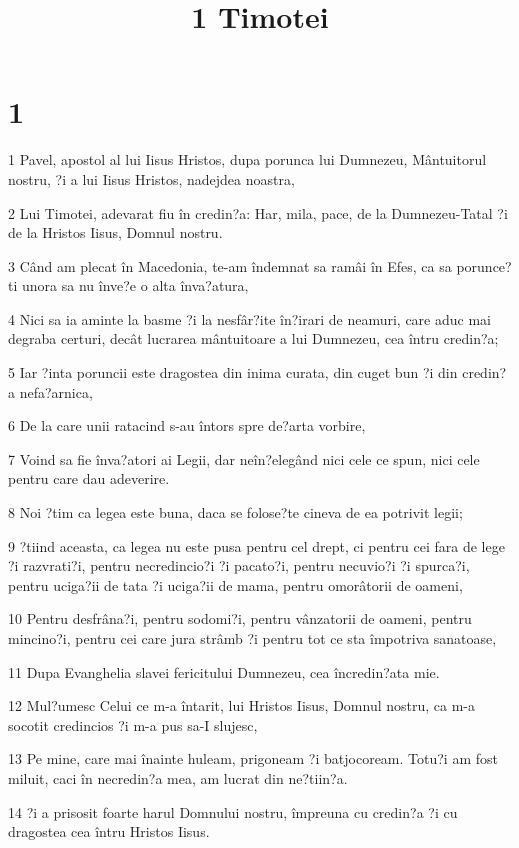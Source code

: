 

\title{1 Timotei}


\chapter{1}

\par 1 Pavel, apostol al lui Iisus Hristos, dupa porunca lui Dumnezeu, Mântuitorul nostru, ?i a lui Iisus Hristos, nadejdea noastra,
\par 2 Lui Timotei, adevarat fiu în credin?a: Har, mila, pace, de la Dumnezeu-Tatal ?i de la Hristos Iisus, Domnul nostru.
\par 3 Când am plecat în Macedonia, te-am îndemnat sa ramâi în Efes, ca sa porunce?ti unora sa nu înve?e o alta înva?atura,
\par 4 Nici sa ia aminte la basme ?i la nesfâr?ite în?irari de neamuri, care aduc mai degraba certuri, decât lucrarea mântuitoare a lui Dumnezeu, cea întru credin?a;
\par 5 Iar ?inta poruncii este dragostea din inima curata, din cuget bun ?i din credin?a nefa?arnica,
\par 6 De la care unii ratacind s-au întors spre de?arta vorbire,
\par 7 Voind sa fie înva?atori ai Legii, dar neîn?elegând nici cele ce spun, nici cele pentru care dau adeverire.
\par 8 Noi ?tim ca legea este buna, daca se folose?te cineva de ea potrivit legii;
\par 9 ?tiind aceasta, ca legea nu este pusa pentru cel drept, ci pentru cei fara de lege ?i razvrati?i, pentru necredincio?i ?i pacato?i, pentru necuvio?i ?i spurca?i, pentru uciga?ii de tata ?i uciga?ii de mama, pentru omorâtorii de oameni,
\par 10 Pentru desfrâna?i, pentru sodomi?i, pentru vânzatorii de oameni, pentru mincino?i, pentru cei care jura strâmb ?i pentru tot ce sta împotriva sanatoase,
\par 11 Dupa Evanghelia slavei fericitului Dumnezeu, cea încredin?ata mie.
\par 12 Mul?umesc Celui ce m-a întarit, lui Hristos Iisus, Domnul nostru, ca m-a socotit credincios ?i m-a pus sa-I slujesc,
\par 13 Pe mine, care mai înainte huleam, prigoneam ?i batjocoream. Totu?i am fost miluit, caci în necredin?a mea, am lucrat din ne?tiin?a.
\par 14 ?i a prisosit foarte harul Domnului nostru, împreuna cu credin?a ?i cu dragostea cea întru Hristos Iisus.
